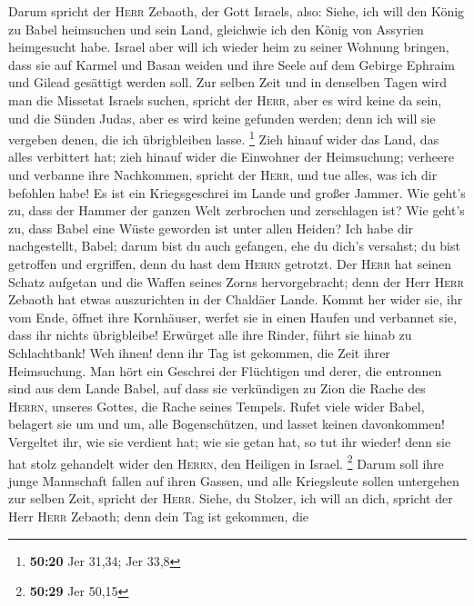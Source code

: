  Darum spricht der \textsc{Herr} Zebaoth, der Gott
Israels, also: Siehe, ich will den König zu Babel heimsuchen und sein
Land, gleichwie ich den König von Assyrien heimgesucht habe.
 Israel aber will ich wieder heim zu seiner Wohnung
bringen, dass sie auf Karmel und Basan weiden und ihre Seele auf dem
Gebirge Ephraim und Gilead gesättigt werden soll.  Zur
selben Zeit und in denselben Tagen wird man die Missetat Israels suchen,
spricht der \textsc{Herr}, aber es wird keine da sein, und die Sünden
Judas, aber es wird keine gefunden werden; denn ich will sie vergeben
denen, die ich übrigbleiben lasse. \footnote{\textbf{50:20} Jer 31,34;
  Jer 33,8}  Zieh hinauf wider das Land, das alles
verbittert hat; zieh hinauf wider die Einwohner der Heimsuchung;
verheere und verbanne ihre Nachkommen, spricht der \textsc{Herr}, und
tue alles, was ich dir befohlen habe!  Es ist ein
Kriegsgeschrei im Lande und großer Jammer.  Wie geht's
zu, dass der Hammer der ganzen Welt zerbrochen und zerschlagen ist? Wie
geht's zu, dass Babel eine Wüste geworden ist unter allen Heiden?
 Ich habe dir nachgestellt, Babel; darum bist du auch
gefangen, ehe du dich's versahst; du bist getroffen und ergriffen, denn
du hast dem \textsc{Herrn} getrotzt.  Der \textsc{Herr}
hat seinen Schatz aufgetan und die Waffen seines Zorns hervorgebracht;
denn der Herr \textsc{Herr} Zebaoth hat etwas auszurichten in der
Chaldäer Lande.  Kommt her wider sie, ihr vom Ende,
öffnet ihre Kornhäuser, werfet sie in einen Haufen und verbannet sie,
dass ihr nichts übrigbleibe!  Erwürget alle ihre Rinder,
führt sie hinab zu Schlachtbank! Weh ihnen! denn ihr Tag ist gekommen,
die Zeit ihrer Heimsuchung.  Man hört ein Geschrei der
Flüchtigen und derer, die entronnen sind aus dem Lande Babel, auf dass
sie verkündigen zu Zion die Rache des \textsc{Herrn}, unseres Gottes,
die Rache seines Tempels.  Rufet viele wider Babel,
belagert sie um und um, alle Bogenschützen, und lasset keinen
davonkommen! Vergeltet ihr, wie sie verdient hat; wie sie getan hat, so
tut ihr wieder! denn sie hat stolz gehandelt wider den \textsc{Herrn},
den Heiligen in Israel. \footnote{\textbf{50:29} Jer 50,15}
 Darum soll ihre junge Mannschaft fallen auf ihren
Gassen, und alle Kriegsleute sollen untergehen zur selben Zeit, spricht
der \textsc{Herr}.  Siehe, du Stolzer, ich will an dich,
spricht der Herr \textsc{Herr} Zebaoth; denn dein Tag ist gekommen, die
